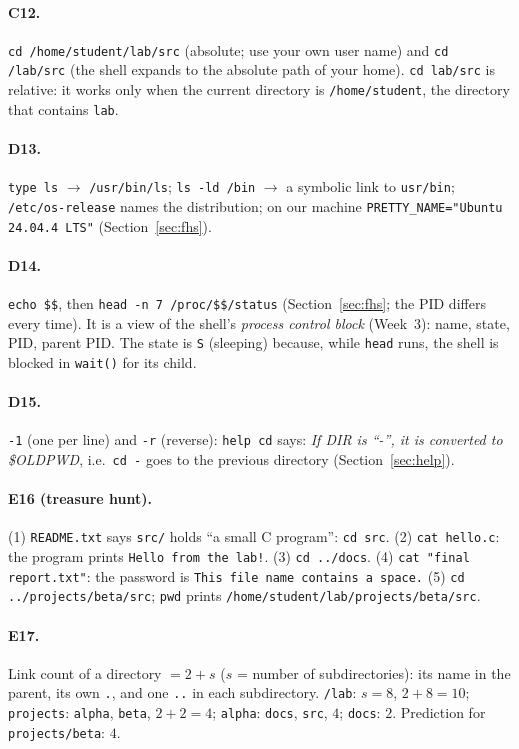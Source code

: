 \documentclass[11pt,a4paper]{article}
\newcommand{\cmd}[1]{\texttt{#1}}
\begin{document}
\paragraph{C12.} \cmd{cd /home/student/lab/src} (absolute; use your own user name) and \cmd{cd \tl/lab/src} (the shell expands \texttt{\tl} to the absolute path of your home). \cmd{cd lab/src} is relative: it works only when the current directory is \texttt{/home/student}, the directory that contains \texttt{lab}.

\paragraph{D13.} \cmd{type ls} $\to$ \texttt{/usr/bin/ls}; \cmd{ls -ld /bin} $\to$ a symbolic link to \texttt{usr/bin}; \texttt{/etc/os-release} names the distribution; on our machine \texttt{PRETTY\_NAME="Ubuntu 24.04.4 LTS"} (Section~\ref{sec:fhs}).

\paragraph{D14.} \cmd{echo \$\$}, then \cmd{head -n 7 /proc/\$\$/status} (Section~\ref{sec:fhs}; the PID differs every time). It is a view of the shell's \emph{process control block} (Week~3): name, state, PID, parent PID. The state is \texttt{S} (sleeping) because, while \cmd{head} runs, the shell is blocked in \texttt{wait()} for its child.

\paragraph{D15.} \cmd{-1} (one per line) and \cmd{-r} (reverse):
\cmd{help cd} says: \emph{If DIR is ``-'', it is converted to \$OLDPWD}, i.e.\ \cmd{cd -} goes to the previous directory (Section~\ref{sec:help}).

\paragraph{E16 (treasure hunt).} (1) \texttt{README.txt} says \texttt{src/} holds ``a small C program'': \cmd{cd src}. (2) \cmd{cat hello.c}: the program prints \texttt{Hello from the lab!}. (3) \cmd{cd ../docs}. (4) \cmd{cat "final report.txt"}: the password is \texttt{This file name contains a space.} (5) \cmd{cd ../projects/beta/src}; \cmd{pwd} prints \texttt{/home/student/lab/projects/beta/src}.

\paragraph{E17.} Link count of a directory $= 2 + s$ ($s$ = number of subdirectories): its name in the parent, its own \texttt{.}, and one \texttt{..} in each subdirectory. \texttt{\tl/lab}: $s = 8$, $2+8 = 10$; \texttt{projects}: \texttt{alpha}, \texttt{beta}, $2+2 = 4$; \texttt{alpha}: \texttt{docs}, \texttt{src}, $4$; \texttt{docs}: $2$. Prediction for \texttt{projects/beta}: $4$.
\end{document}

